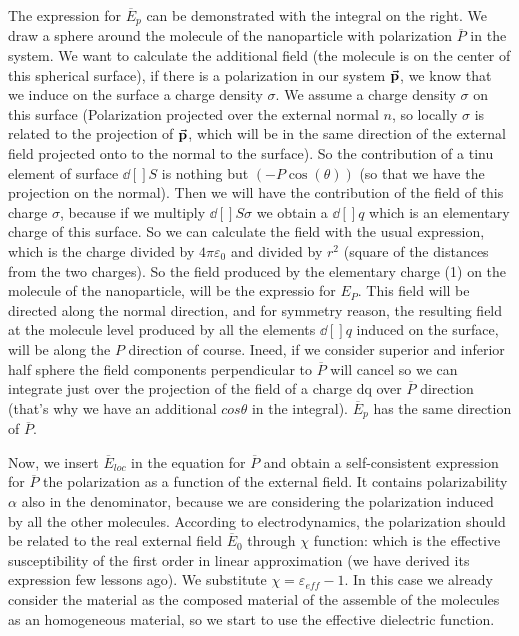 \documentclass[../main/main.tex]{subfiles}
\begin{document}
\begin{enumerate}
    The expression for $\overline{E}_{p}$ can be demonstrated with the integral on the right. We draw a sphere around the molecule of the nanoparticle with polarization $\overline{P}$ in the system.
    We want to calculate the additional field (the molecule is on the center of this spherical surface), if there is a polarization in our system \( \va{p} \), we know that we induce on the surface a charge density \( \sigma  \).
    We assume a charge density $\sigma$ on this surface (Polarization projected over the external normal $n$, so locally \( \sigma  \) is related to the projection of \( \va{p} \), which will be in the same direction of the external field projected onto to the normal to the surface). So the contribution of a tinu element of surface \( \dd[]{S}  \) is nothing but \( (-P \cos(\theta ) ) \) (so that we have the projection on the normal). Then we will have the contribution of the field of this charge \( \sigma  \), because if we multiply \( \dd[]{S} \sigma   \) we obtain a \( \dd[]{q}  \) which is an elementary charge of this surface.  So we can calculate the field with the usual expression, which is the charge divided by \( 4 \pi \varepsilon _0 \) and divided by \( r^2 \) (square of the distances from the two charges). So the field produced by the elementary charge (1) on the molecule of the nanoparticle, will be the expressio for \( E_P \). This field will be directed along the normal direction, and for symmetry reason, the resulting field at the molecule level produced by all the elements \( \dd[]{q} \) induced on the surface, will be along the \( P  \) direction of course.
    Ineed, if we consider superior and inferior half sphere the field components perpendicular to $\overline{P}$ will cancel so we can integrate just over the projection of the field of a charge dq over $\overline{P}$ direction (that's why we have an additional $cos \theta$ in the integral).
    $\overline{E}_{p}$ has the same direction of $\overline{P}$.

    Now, we insert $\overline{E}_{loc}$ in the equation for $\overline{P}$ and obtain a self-consistent expression for $\overline{P}$ the polarization as a function of the external field. It contains polarizability $\alpha$ also in the denominator, because we are considering the polarization induced by all the other molecules.
    According to electrodynamics, the polarization should be related to the real external field $\overline{E}_{0}$ through $\chi$ function: which is the effective susceptibility of the first order in linear approximation (we have derived its expression few lessons ago).
    We substitute \( \chi = \varepsilon _{eff} -1  \). In this case we already consider the material as the composed material of the assemble of the molecules as an homogeneous material, so we start to use the effective dielectric function.


\end{enumerate}
\end{document}
